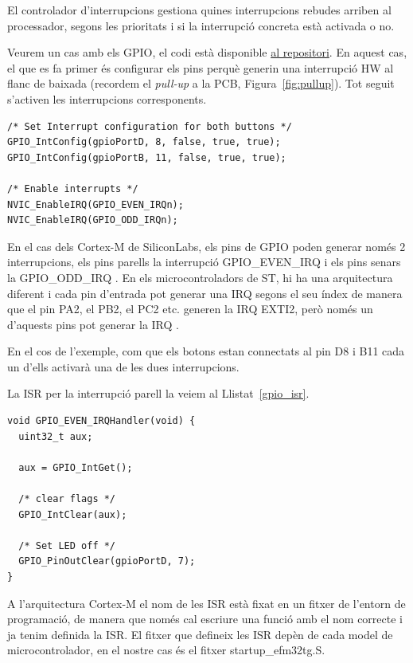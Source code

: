 El controlador d'interrupcions gestiona quines interrupcions rebudes arriben al processador, segons les prioritats i si la interrupció concreta està activada o no.

Veurem un cas amb els GPIO, el codi està disponible \href{https://github.com/mariusmm/cursembedded/tree/master/Simplicity/GPIO_2}{al repositori}. En aquest cas, el que es fa primer és configurar els pins perquè generin una interrupció HW al flanc de baixada (recordem el {\em pull-up} a la PCB, Figura~\ref{fig:pullup}). Tot seguit s'activen les interrupcions corresponents.
\begin{lstlisting}[style=customc]
 /* Set Interrupt configuration for both buttons */
GPIO_IntConfig(gpioPortD, 8, false, true, true);
GPIO_IntConfig(gpioPortB, 11, false, true, true);

/* Enable interrupts */
NVIC_EnableIRQ(GPIO_EVEN_IRQn);
NVIC_EnableIRQ(GPIO_ODD_IRQn);
\end{lstlisting}

En el cas dels Cortex-M de SiliconLabs, els pins de \gls{GPIO} poden generar només 2 interrupcions, els pins parells la interrupció GPIO\_EVEN\_IRQ i els pins senars la GPIO\_ODD\_IRQ \cite[405]{EFM32GRM}. En els microcontroladors de ST, hi ha una arquitectura diferent i cada pin d'entrada pot generar una IRQ segons el seu índex de manera que el pin PA2, el PB2, el PC2 etc. generen la IRQ EXTI2, però només un d'aquests pins pot generar la IRQ \cite[384]{STM32F4RM}.

En el cos de l'exemple, com que els botons estan connectats al pin D8 i B11 cada un d'ells activarà una de les dues interrupcions.

La \gls{ISR} per la interrupció parell la veiem al Llistat~\ref{gpio_isr}.
\begin{lstlisting}[style=customc, label=gpio_isr, caption=Exemple d'ISR per GPIO]
void GPIO_EVEN_IRQHandler(void) {
  uint32_t aux;

  aux = GPIO_IntGet();

  /* clear flags */
  GPIO_IntClear(aux);

  /* Set LED off */
  GPIO_PinOutClear(gpioPortD, 7);
}
\end{lstlisting}

A l'arquitectura Cortex-M el nom de les ISR està fixat en un fitxer de l'entorn de programació, de manera que només cal escriure una funció amb el nom correcte i ja tenim definida la ISR. El fitxer que defineix les ISR depèn de cada model de microcontrolador, en el nostre cas és el fitxer startup\_efm32tg.S.

